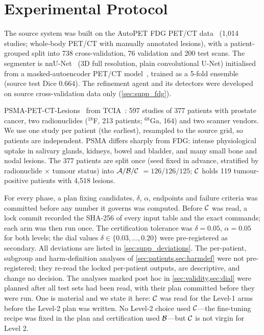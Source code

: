 \section{Experimental Protocol}
\label{sec:setup}

 The source system was built on the AutoPET FDG PET/CT data~\cite{gatidis2022autopet} (1,014 studies; whole-body PET/CT with manually annotated lesions), with a patient-grouped split into 738 cross-validation, 76 validation and 200 test scans.
The segmenter is nnU-Net~\cite{isensee2021nnunet} (3D full resolution, plain convolutional U-Net) initialised from a masked-autoencoder PET/CT model~\cite{he2022mae,liu2026petctmae}, trained as a 5-fold ensemble (source test Dice $0.664$).
The refinement agent and its detectors were developed on source cross-validation data only (\cref{sec:supp_fdg}).

 PSMA-PET-CT-Lesions~\cite{psma2025tcia} from TCIA~\cite{clark2013tcia}: 597 studies of 377 patients with prostate cancer, two radionuclides ($^{18}$F, 213 patients; $^{68}$Ga, 164) and two scanner vendors.
We use one study per patient (the earliest), resampled to the source grid, so patients are independent.
PSMA differs sharply from FDG: intense physiological uptake in salivary glands, kidneys, bowel and bladder, and many small bone and nodal lesions.
The 377 patients are split once (seed fixed in advance, stratified by radionuclide $\times$ tumour status) into $\mathcal{A}/\mathcal{B}/\mathcal{C}$ $=126/126/125$; $\mathcal{C}$ holds 119 tumour-positive patients with 4,518 lesions.

 For every phase, a plan fixing candidates, $\delta$, $\alpha$, endpoints and failure criteria was committed before any number it governs was computed.
Before $\mathcal{C}$ was read, a lock commit recorded the SHA-256 of every input table and the exact commands; each arm was then run once.
The certification tolerance was $\delta=0.05$, $\alpha=0.05$ for both levels; the dial values $\delta\in\{0.03,\dots,0.20\}$ were pre-registered as secondary.
All deviations are listed in \cref{sec:supp_deviations}.
The per-patient, subgroup and harm-definition analyses of \cref{sec:patients,sec:harmdef} were not pre-registered; they re-read the locked per-patient outputs, are descriptive, and change no decision. The analyses marked post hoc in \cref{sec:validity,sec:dial} were planned after all test sets had been read, with their plan committed before they were run.
One is material and we state it here: $\mathcal{C}$ was read for the Level-1 arms before the Level-2 plan was written. No Level-2 choice used $\mathcal{C}$---the fine-tuning recipe was fixed in the plan and certification used $\mathcal{B}$---but $\mathcal{C}$ is not virgin for Level 2.

